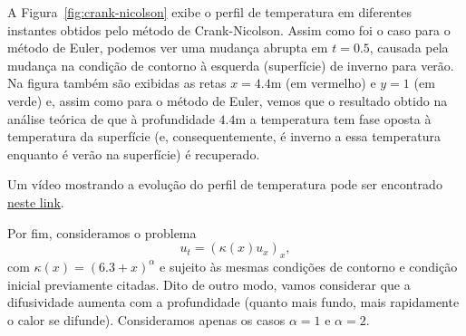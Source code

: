 \documentclass[twocolumn,showpacs,%
  nofootinbib,aps,superscriptaddress,%
  eqsecnum,prd,notitlepage,showkeys,10pt]{revtex4-1} %
\begin{document}
	A Figura~\ref{fig:crank-nicolson} exibe o perfil de temperatura em diferentes instantes
	obtidos pelo método de Crank-Nicolson.
	Assim como foi o caso para o método de Euler, podemos ver uma mudança abrupta em $t=0.5$,
	causada pela mudança na condição de contorno
	à esquerda (superfície) de inverno para verão. Na figura também são exibidas as retas 
	$x=4.4$m (em vermelho) e $y=1$ (em verde) e, assim como para o método de Euler, vemos
	que o resultado obtido na análise teórica de que
	à profundidade $4.4$m a temperatura tem fase oposta à temperatura da superfície
	(e, consequentemente, é inverno a essa temperatura enquanto é verão na superfície)
	é recuperado.
	
	Um vídeo mostrando a evolução do perfil de temperatura pode ser encontrado
	\href{https://github.com/CaioTomas/Trabalho-IMCEDP/blob/main/Report/Codes/crank-nicolson.mp4}{neste link}.

	Por fim, consideramos o problema
	\begin{equation}
		u_t = {\left( \kappa(x)u_x \right)}_x,
	\end{equation}
	com $\kappa(x) = {(6.3 + x)}^{\alpha}$ e sujeito às mesmas condições de contorno e condição inicial previamente citadas.
	Dito de outro modo, vamos considerar que a difusividade aumenta com a profundidade
	(quanto mais fundo, mais rapidamente o calor se difunde). Consideramos apenas os casos $\alpha = 1$ e $\alpha = 2$.
\end{document}
